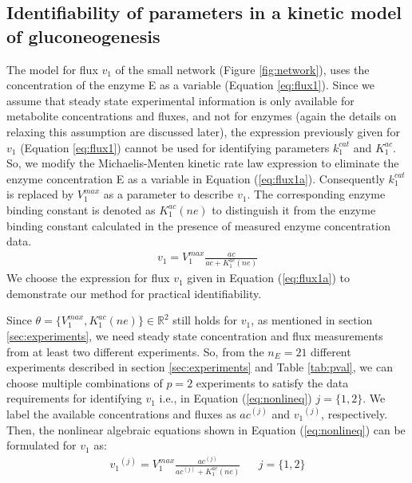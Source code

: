 \documentclass[10pt]{article}
\begin{document}
	\subsection{Identifiability of parameters in a kinetic model of gluconeogenesis}\label{sec:example}	
	The model for flux $v_1$ of the small network (Figure \ref{fig:network}), uses the concentration of the enzyme E as a variable (Equation \ref{eq:flux1}). Since we assume that steady state experimental information is only available for metabolite concentrations and fluxes, and not for enzymes (again the details on relaxing this assumption are discussed later), the expression previously given for $v_1$ (Equation \ref{eq:flux1}) cannot be used for identifying parameters $k_1^{cat}$ and $K_1^{ac}$. So, we modify the Michaelis-Menten kinetic rate law expression to eliminate the enzyme concentration E as a variable in Equation (\ref{eq:flux1a}). Consequently $k_1^{cat}$ is replaced by $V_1^{max}$ as a parameter to describe $v_1$. The corresponding enzyme binding constant is denoted as $K_1^{ac} (ne)$ to distinguish it from the enzyme binding constant calculated in the presence of measured enzyme concentration data.
	\begin{align}\label{eq:flux1a}
	v_1 = V_1^{max}\frac{ac}{ac+K_{1}^{ac}(ne)}
	\end{align}		
	We choose the expression for flux $v_1$ given in Equation (\ref{eq:flux1a}) to demonstrate our method for practical identifiability. 
	
	Since $\theta = \{V_1^{max}, K_1^{ac} (ne)\} \in \mathbb{R}^2$ still holds for $v_1$, as mentioned in section \ref{sec:experiments}, we need steady state concentration and flux measurements from at least two different experiments. So, from the $n_E = 21$ different experiments described in section \ref{sec:experiments} and Table \ref{tab:pval}, we can choose multiple combinations of $p = 2$ experiments to satisfy the data requirements for identifying $v_1$ i.e., in Equation (\ref{eq:nonlineq}) $j = \{1, 2\}$. We label the available concentrations and fluxes as ${ac}^{(j)}$ and ${v_1}^{(j)}$, respectively. Then, the nonlinear algebraic equations shown in Equation (\ref{eq:nonlineq}) can be formulated for $v_1$ as:
	\begin{align*}%
	{v_1}^{(j)} = V_{1}^{max}\frac{ac^{(j)}}{ac^{(j)}+K_{1}^{ac}(ne)} &&  j=\{1, 2\}
	\end{align*}
	
\end{document}
